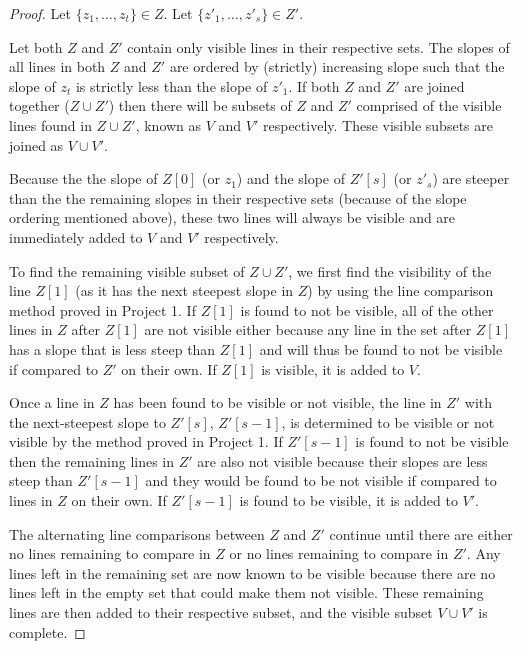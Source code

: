 \documentclass{article}
\begin{document}
\begin{proof}
Let $\{z_{1},\ldots,z_{t}\} \in Z$. Let $\{z'_{1},\ldots,z'_{s}\} \in Z'$.

Let both $Z$ and $Z'$ contain only visible lines in their respective sets. The slopes of all lines in both $Z$ and $Z'$ are ordered by (strictly) increasing slope such that the slope of $z_{t}$ is strictly less than the slope of $z'_{1}$. If both $Z$ and $Z'$ are joined together ($Z \cup Z'$) then there will be subsets of $Z$ and $Z'$ comprised of the visible lines found in $Z \cup Z'$, known as $V$ and $V'$ respectively. These visible subsets are joined as $V \cup V'$.\newline

Because the the slope of $Z[0]$ (or $z_{1}$) and the slope of $Z'[s]$ (or $z'_{s}$) are steeper than the the remaining slopes in their respective sets (because of the slope ordering mentioned above), these two lines will always be visible and are immediately added to $V$ and $V'$ respectively.\newline

To find the remaining visible subset of $Z \cup Z'$, we first find the visibility of the line $Z[1]$ (as it has the next steepest slope in $Z$) by using the line comparison method proved in Project 1. If $Z[1]$ is found to not be visible, all of the other lines in $Z$ after $Z[1]$ are not visible either because any line in the set after $Z[1]$ has a slope that is less steep than $Z[1]$ and will thus be found to not be visible if compared to $Z'$ on their own. If $Z[1]$ is visible, it is added to $V$.\newline

Once a line in $Z$ has been found to be visible or not visible, the line in $Z'$ with the next-steepest slope to $Z'[s]$, $Z'[s-1]$, is determined to be visible or not visible by the method proved in Project 1. If $Z'[s-1]$ is found to not be visible then the remaining lines in $Z'$ are also not visible because their slopes are less steep than $Z'[s-1]$ and they would be found to be not visible if compared to lines in $Z$ on their own. If $Z'[s-1]$ is found to be visible, it is added to $V'$.\newline

The alternating line comparisons between $Z$ and $Z'$ continue until there are either no lines remaining to compare in $Z$ or no lines remaining to compare in $Z'$. Any lines left in the remaining set are now known to be visible because there are no lines left in the empty set that could make them not visible. These remaining lines are then added to their respective subset, and the visible subset $V \cup V'$ is complete.\end{proof}
\end{document}
